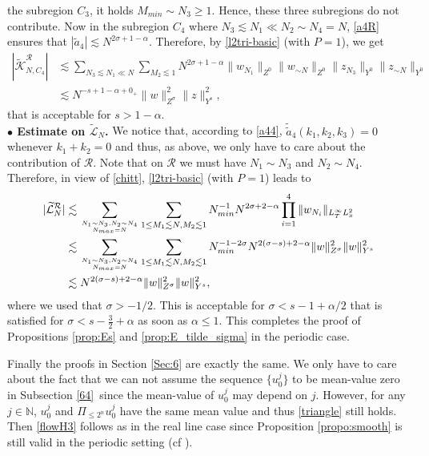 \documentclass{amsart}
\theoremstyle{definition}
\theoremstyle{remark}
\newcommand{\N}{\mathbb{N}}
\numberwithin{equation}{section}
\begin{document}
 the subregion $ C_3 $, it holds $M_{min}\sim N_3\ge 1 $. Hence, these three subregions do not contribute. Now in the subregion $ C_4 $ where $ N_3\lesssim N_1\ll N_2 \sim N_4=N $, \eqref{a4R} ensures that $|\tilde{a}_4| \lesssim N^{2\sigma+1-\alpha} $.
 Therefore, by \eqref{l2tri-basic}  (with $ P=1$), we get 
 \begin{align*}
  |\widetilde{\mathcal{K}}_{N,C_4}^{\mathcal R}| &\lesssim \sum_{N_3\lesssim N_1\ll N}\sum_{M_2\lesssim  1} N^{2\sigma+1-\alpha} \|w_{N_1}\|_{Z^0} \|w_{\sim N}\|_{Z^0} \|z_{N_3}\|_{Y^0} \|z_{\sim N}\|_{Y^0} \\
  &\lesssim N^{-s+1-\alpha+0_+}\|w\|_{Z^\sigma}^2 \|z\|_{Y^s}^2,
\end{align*}
that is acceptable for $s>1-\alpha $.\\
{\bf $\bullet $ Estimate on $ \widetilde{{\mathcal L}}_N $.}
 We notice that, according to \eqref{a44}, $ \tilde{\tilde{a}}_4(k_1,k_2,k_3) =0 $ whenever $ k_1+k_2=0$ and thus, as above, we only have to care about the contribution of ${\mathcal R} $. Note that on ${\mathcal R} $ we must have $ N_1 \sim N_3 $ and $
 N_2 \sim N_4$. Therefore, in view of \eqref{chitt},  \eqref{l2tri-basic}  (with $ P=1$) leads to 
  \begin{align*}
  |\widetilde{\mathcal{L}}_{N}^{\mathcal R}| &\lesssim\sum_{N_1\sim N_3, N_2\sim N_4 \atop N_{max}=N} \sum_{1\le M_1\lesssim N, M_2\lesssim 1} N_{min}^{-1} N^{2\sigma+2-\alpha} \prod_{i=1}^4 \|w_{N_i}\|_{L^\infty_T L^2_x} \\
  &\lesssim\sum_{N_1\sim N_3, N_2\sim N_4 \atop N_{max}=N} \sum_{1\le M_1\lesssim N, M_2\lesssim 1} N_{min}^{-1-2\sigma} N^{2(\sigma-s)+2-\alpha}\|w\|_{Z^\sigma}^2 \|w\|_{Y^s}^2 \\
  &\lesssim N^{2(\sigma-s)+2-\alpha} \|w\|_{Z^\sigma}^2 \|w\|_{Y^s}^2,
\end{align*}
where we used that $ \sigma>-1/2$. This is acceptable for $ \sigma<s-1+\alpha/2 $ that is satisfied for $ \sigma<s-\frac32+\alpha $ as soon as $ \alpha\le 1$. This completes the proof of Propositions \ref{prop:Es} and  \ref{prop:E_tilde_sigma} in the periodic case. 


Finally the proofs in  Section \ref{Sec:6} are exactly the same. We only have to care about the fact that we can not assume the sequence $\{u_0^j\} $ to be mean-value zero in Subsection \ref{64} since the mean-value of $
 u_0^j $ may depend on $ j$. However,  for any $j\in \N$, $u_0^j$ and $\Pi_{\le 2^n}u_0^j$ have the same mean value and thus \eqref{triangle} still holds. Then \eqref{flowH3} follows as in the real line case since Proposition \ref{propo:smooth} is still valid  in the periodic setting (cf \cite{ABFS89}).
\appendix 
\end{document}
